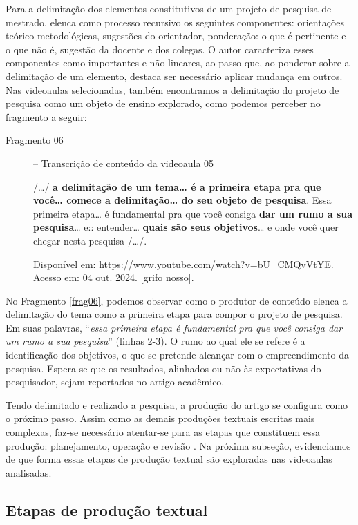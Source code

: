 Para a delimitação dos elementos constitutivos de um projeto de pesquisa
de mestrado, \textcite{silva2021} elenca como processo recursivo os seguintes
componentes: orientações teórico-metodológicas, sugestões do orientador,
ponderação: o que é pertinente e o que não é, sugestão da docente e dos
colegas. O autor caracteriza esses componentes como importantes e
não-lineares, ao passo que, ao ponderar sobre a delimitação de um
elemento, destaca ser necessário aplicar mudança em outros. Nas
videoaulas selecionadas, também encontramos a delimitação do projeto de
pesquisa como um objeto de ensino explorado, como podemos perceber no
fragmento a seguir:

\begin{description}
    \item[Fragmento 06\label{frag06}] -- Transcrição de conteúdo da videoaula 05
    
    /\ldots/ \textbf{a delimitação de um tema\ldots{} é a primeira etapa pra
que você\ldots{} comece a delimitação\ldots{} do seu objeto de
pesquisa}. Essa primeira etapa\ldots{} é fundamental pra que você
consiga \textbf{dar um rumo a sua pesquisa}\ldots{} e:: entender\ldots{}
\textbf{quais são seus objetivos}\ldots{} e onde você quer chegar nesta
pesquisa /\ldots/.

Disponível em:
\url{https://www.youtube.com/watch?v=bU_CMQvVtYE}.
Acesso em: 04 out. 2024. {[}grifo nosso{]}.
\end{description}



No Fragmento \ref{frag06}, podemos observar como o produtor de conteúdo elenca a
delimitação do tema como a primeira etapa para compor o projeto de
pesquisa. Em suas palavras, ``\emph{essa primeira etapa é fundamental
pra que você consiga dar um rumo a sua pesquisa}'' (linhas 2-3). O rumo
ao qual ele se refere é a identificação dos objetivos, o que se pretende
alcançar com o empreendimento da pesquisa. Espera-se que os resultados,
alinhados ou não às expectativas do pesquisador, sejam reportados no
artigo acadêmico.

Tendo delimitado e realizado a pesquisa, a produção do artigo se
configura como o próximo passo. Assim como as demais produções textuais
escritas mais complexas, faz-se necessário atentar-se para as etapas que
constituem essa produção: planejamento, operação e revisão \cite{antunes2003}. Na próxima subseção, evidenciamos de que forma essas etapas de
produção textual são exploradas nas videoaulas analisadas.

\subsection{Etapas de produção textual} \label{sub-sec-etapas}



